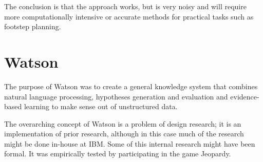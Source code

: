 \documentclass[a4paper, 12pt]{article}
\begin{document}
The conclusion is that the approach works, but is very noisy and will require
more computationally intensive or accurate methods for practical tasks such as
footstep planning.

\section{Watson}
The purpose of Watson was to create a general knowledge system that combines natural language
processing, hypotheses generation and evaluation and evidence-based learning to
make sense out of unstructured data.

The overarching concept of Watson is a problem of design research; it is an
implementation of prior research, although in this case much of the research
might be done in-house at IBM. Some of this internal research might have been
formal.
It was empirically tested by participating in the game Jeopardy.
	
\end{document}
